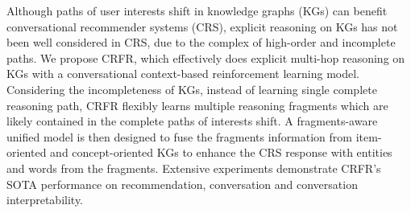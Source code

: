 Although paths of user interests shift in knowledge graphs (KGs) can benefit conversational recommender systems (CRS), explicit reasoning on KGs has not been well considered in CRS, due to the complex of high-order and incomplete paths. We propose CRFR, which effectively does explicit multi-hop reasoning on KGs with a conversational context-based reinforcement learning model. Considering the incompleteness of KGs, instead of learning single complete reasoning path, CRFR flexibly learns multiple reasoning fragments which are likely contained in the complete paths of interests shift. A fragments-aware unified model is then designed to fuse the fragments information from item-oriented and concept-oriented KGs to enhance the CRS response with entities and words from the fragments. Extensive experiments demonstrate CRFR's SOTA performance on recommendation, conversation and conversation interpretability.
